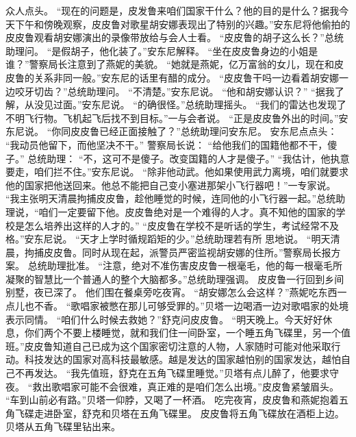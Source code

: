 \documentclass[a4paper,12pt,UTF8,twoside]{ctexbook}
\begin{document}
        众人点头。  
        “现在的问题是，皮发鲁来咱们国家干什么？他的目的是什么？据我今天下午和傍晚观察，皮皮鲁对歌星胡安娜表现出了特别的兴趣。”安东尼将他偷拍的皮皮鲁观看胡安娜演出的录像带放给与会人士看。  
        “皮皮鲁的胡子这么长？”总统助理问。  
        “是假胡子，他化装了。”安东尼解释。  
        “坐在皮皮鲁身边的小姐是谁？”警察局长注意到了燕妮的美貌。  
        “她就是燕妮，亿万富翁的女儿，现在和皮皮鲁的关系非同一般。”安东尼的话里有醋的成分。  
        “皮皮鲁干吗一边看着胡安娜一边咬牙切齿？”总统助理问。  
        “不清楚。”安东尼说。  
        “他和胡安娜认识？”  
        “据我了解，从没见过面。”安东尼说。        
        “的确很怪。”总统助理摇头。  
        “我们的雷达也发现了不明飞行物。飞机起飞后找不到目标。”一与会者说。  
        “正是皮皮鲁外出的时间。”安东尼说。  
        “你同皮皮鲁已经正面接触了？”总统助理问安东尼。  
        安东尼点点头：  
        “我动员他留下，而他坚决不干。”  
        警察局长说：  
        “给他我们的国籍他都不干，傻子。”  
        总统助理：  
        “不，这可不是傻子。改变国籍的人才是傻子。”  
        “我估计，他执意要走，咱们拦不住。”安东尼说。  
        “除非他动武。他如果使用武力离境，咱们就要求他的国家把他送回来。他总不能把自己变小塞进那架小飞行器吧！”一专家说。  
        “我主张明天清晨拘捕皮皮鲁，趁他睡觉的时候，连同他的小飞行器一起。”总统助理说，“咱们一定要留下他。皮皮鲁绝对是一个难得的人才。真不知他的国家的学校是怎么培养出这样的人才的。”  
        “皮皮鲁在学校不是听话的学生，考试经常不及格。”安东尼说。  
        “天才上学时循规蹈矩的少。”总统助理若有所        思地说。  
        “明天清晨，拘捕皮皮鲁。同时从现在起，派警员严密监视胡安娜的住所。”警察局长报方案。  
        总统助理批准。  
        “注意，绝对不准伤害皮皮鲁一根毫毛，他的每一根毫毛所凝聚的智慧比一个普通人的整个大脑都多。”总统助理强调。  
        皮皮鲁一行回到乡间别墅，夜已深了。  
        他们围在餐桌旁吃夜宵。  
        “胡安娜怎么会这样？”燕妮吃东西一点儿也不香。  
        “歌唱家被憋在那儿可够受罪的。”贝塔一边喝酒一边对歌唱家的处境表示同情。  
        “咱们什么时候去救她？”舒克问皮皮鲁。  
        “明天晚上。今天好好休息，你们两个不要上楼睡觉，就和我们住一间卧室，一个睡五角飞碟里，另一个值班。”皮皮鲁知道自己已成为这个国家密切注意的人物，人家随时可能对他采取行动。科技发达的国家对高科技最敏感。越是发达的国家越怕别的国家发达，越怕自己不再发达。  
        “我先值班，舒克在五角飞碟里睡觉。”贝塔有点儿醉了，他要求守夜。  
        “救出歌唱家可能不会很难，真正难的是咱们怎么出境。”皮皮鲁紧皱眉头。        
        “车到山前必有路。”贝塔一仰脖，又喝了一杯酒。  
        吃完夜宵，皮皮鲁和燕妮抱着五角飞碟走进卧室，舒克和贝塔在五角飞碟里。  
        皮皮鲁将五角飞碟放在酒柜上边。贝塔从五角飞碟里钻出来。  
\end{document}
